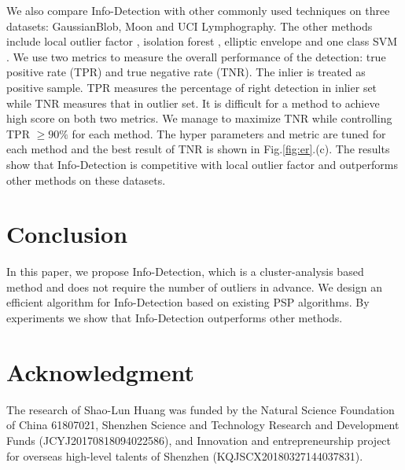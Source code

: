 \documentclass[runningheads]{llncs}
\begin{document}
We also compare Info-Detection with other commonly used techniques on three datasets: GaussianBlob, Moon and UCI Lymphography. The other methods include local outlier factor \cite{Breunig}, isolation forest \cite{if}, elliptic envelope \cite{rousseeuw1999fast} and one class SVM \cite{svm}. We use two metrics to measure the overall performance of the detection: true positive rate (TPR) and true negative rate (TNR). The inlier is treated as positive sample. TPR measures the percentage of right detection in inlier set while TNR measures that in outlier set. It is difficult for a method to achieve high score on both two metrics. We manage to maximize TNR while controlling TPR $\geq 90\%$ for each method. The hyper parameters and metric are tuned for each method and the best result of TNR is shown in Fig.\ref{fig:er}.(c). The results show that Info-Detection is competitive with local outlier factor and outperforms other methods on these datasets.

\section{Conclusion}\label{sec:Conclusion}
In this paper, we propose Info-Detection, which is a cluster-analysis based method and does not require the number of outliers in advance. We design an efficient algorithm for Info-Detection based on existing PSP algorithms. By experiments we show that Info-Detection outperforms other methods.  
\section*{Acknowledgment}

The research of Shao-Lun Huang was funded by the Natural Science Foundation of China 61807021, Shenzhen Science and Technology Research and Development Funds (JCYJ20170818094022586), and Innovation and entrepreneurship project for overseas high-level talents of Shenzhen (KQJSCX20180327144037831).
%
%
%


%
\end{document}
